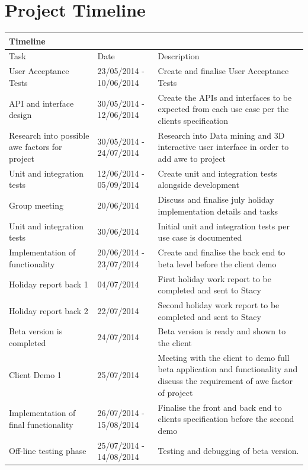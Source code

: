 \documentclass[12pt]{article}
\begin{document}
\section{Project Timeline}
\begin{center}
\begin{longtable}{|p{3cm}|p{3cm}|p{9cm}|}
\hline
\multicolumn{3}{|l|}{\bf Timeline} \\
\hline
 Task & Date & Description  \\
\hline
User Acceptance Tests & 23/05/2014 - 10/06/2014 & Create and finalise User Acceptance Tests \\
\hline
API and interface design & 30/05/2014 - 12/06/2014 & Create the APIs and interfaces to be expected from each use case per the clients specification\\
\hline
Research into possible awe factors for project & 30/05/2014 - 24/07/2014 & Research into Data mining and 3D interactive user interface in order to add awe to project\\
\hline
Unit and integration tests & 12/06/2014 - 05/09/2014 & Create unit and integration tests alongside development\\
\hline
Group meeting & 20/06/2014 & Discuss and finalise july holiday implementation details and tasks\\
\hline
Unit and integration tests & 30/06/2014 & Initial unit and integration tests per use case is documented\\
\hline
Implementation of functionality & 20/06/2014 - 23/07/2014 & Create and finalise the back end to beta level before the client demo \\
\hline
Holiday report back 1 & 04/07/2014 & First holiday work report to be completed and sent to Stacy\\
\hline
Holiday report back 2 & 22/07/2014 & Second holiday work report to be completed and sent to Stacy\\
\hline
Beta version is completed & 24/07/2014 & Beta version is ready and shown to the client  \\
\hline
Client Demo 1 & 25/07/2014 & Meeting with the client to demo full beta application and functionality and discuss the requirement of awe factor of project\\
\hline
Implementation of final functionality & 26/07/2014 - 15/08/2014 & Finalise the front and back end to clients specification before the second demo \\
\hline
Off-line testing phase & 25/07/2014 - 14/08/2014 & Testing and debugging of beta version.\\

\end{longtable}
\end{center}
\end{document}
